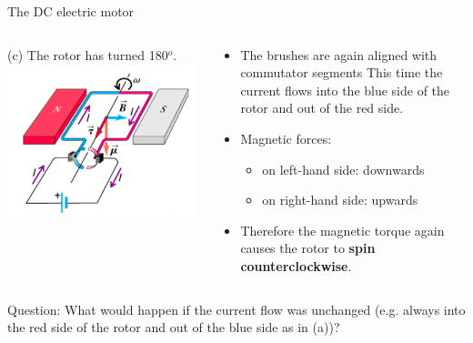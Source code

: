 \begin{frame}{The DC electric motor}

\begin{columns}
  \begin{column}{0.50\textwidth}
    \begin{center}
     (c) The rotor has turned 180$^{o}$.\\
     \vspace{0.3cm}
     \includegraphics[width=0.99\textwidth]{./images/schematics/electric_motor_dc_operation_c.png}\\
    \end{center}
  \end{column}
  \begin{column}{0.50\textwidth}
  {\small
      \begin{itemize}
           \item The brushes are again aligned with commutator segments
                     This time the current flows into the blue side of the rotor and out of the red side.
         \item Magnetic forces:\\
            \begin{itemize}
                \item on {\color{blue}left-hand side}: downwards
                \item on {\color{red}right-hand side}: upwards
            \end{itemize}
           \item Therefore the magnetic torque again causes the rotor to {\bf spin counterclockwise}.
      \end{itemize}
  }
  \end{column}
\end{columns}

\vspace{0.2cm}

Question: What would happen if the current flow was unchanged
(e.g. always into the red side of the rotor and out of the blue side as in (a))?


\end{frame}

